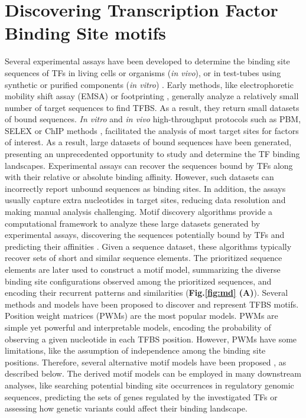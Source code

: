 \documentclass[a4paper, titlepage, openright]{book}
\begin{document}
\section{Discovering Transcription Factor Binding Site motifs}
Several experimental assays have been developed to determine the binding site sequences of TFs in living cells or organisms (\emph{in vivo}), or in test-tubes using synthetic or purified components (\emph{in vitro}) \citep{jolma2011methods}. Early methods, like electrophoretic mobility shift assay (EMSA) \citep{garner1981gel} or footprinting \citep{hampshire2007footprinting},  generally analyze a relatively small number of target sequences to find TFBS. As a result, they return small datasets of bound sequences. \emph{In vitro} and \emph{in vivo} high-throughput protocols such as PBM, SELEX or ChIP methods \citep{berger2006compact,jolma2010multiplexed,collas2008chop}, facilitated the analysis of most target sites for factors of interest. As a result, large datasets of bound sequences have been generated, presenting an unprecedented opportunity to study and determine the TF binding landscapes. Experimental assays can recover the sequences bound by TFs along with their relative or absolute binding affinity. However, such datasets can incorrectly report unbound sequences as binding sites. In addition, the assays usually capture extra nucleotides in target sites, reducing data resolution and making manual analysis challenging. Motif discovery algorithms provide a computational framework to analyze these large datasets generated by experimental assays, discovering the sequences potentially bound by TFs and predicting their affinities \citep{pavesi2004silico,tompa2005assessing,d2006does,das2007survey,zambelli2013motif,tognon2023survey}. Given a sequence dataset, these algorithms typically recover sets of short and similar sequence elements. The prioritized sequence elements are later used to construct a motif model, summarizing the diverse binding site configurations observed among the prioritized sequences, and encoding their recurrent patterns and similarities (\textbf{Fig.\ref{fig:md} (A)}). Several methods and models have been proposed to discover and represent TFBS motifs. Position weight matrices (PWMs) \citep{stormo2000dna} are the most popular models. PWMs are simple yet powerful and interpretable models, encoding the probability of observing a given nucleotide in each TFBS position. However, PWMs have some limitations, like the assumption of independence among the binding site positions. Therefore, several alternative motif models have been proposed \citep{siddharthan2010dinucleotide,gorkin2012integration,he2021survey} , as described below. The derived motif models can be employed in many downstream analyses, like searching potential binding site occurrences in regulatory genomic sequences, predicting the sets of genes regulated by the investigated TFs or assessing how genetic variants could affect their binding landscape.
\end{document}
